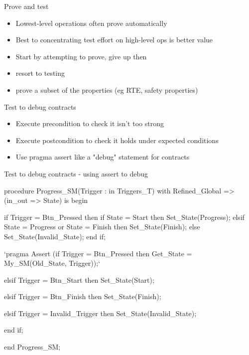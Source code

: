 \documentclass{beamer}
\begin{document}
\begin{frame}[fragile]{Prove and test}
  \begin{itemize}
     \item Lowest-level operations often prove automatically
     \item Best to concentrating test effort on high-level ops is better value
     \item Start by attempting to prove, give up then
     \item resort to testing
     \item prove a subset of the properties (eg RTE, safety properties)
     
  \end{itemize}
\end{frame}

\begin{frame}[fragile]{Test to debug contracts}
  \begin{itemize}
     \item Execute precondition to check it isn't too strong
     \item Execute postcondition to check it holds under expected conditions
     \item Use pragma assert like a "debug" statement for contracts
  \end{itemize}
\end{frame}

\begin{frame}[fragile]{Test to debug contracts - using assert to debug}
  \begin{pxcode}[language=SPARK,style=magic,gobble=3]
   procedure Progress_SM(Trigger : in Triggers_T)
     with Refined_Global => (in_out => State)
   is
   begin

      if Trigger = Btn_Pressed then
         if State = Start then
            Set_State(Progress);
         elsif State = Progress or State = Finish then
            Set_State(Finish);
         else
            Set_State(Invalid_State);
         end if;

         `pragma Assert (if Trigger = Btn_Pressed then Get_State = My_SM(Old_State, Trigger));`

      elsif Trigger = Btn_Start then
         Set_State(Start);

      elsif Trigger = Btn_Finish then
         Set_State(Finish);

      elsif Trigger = Invalid_Trigger then
         Set_State(Invalid_State);

      end if;

   end Progress_SM;
  \end{pxcode}
\end{frame}
\end{document}
